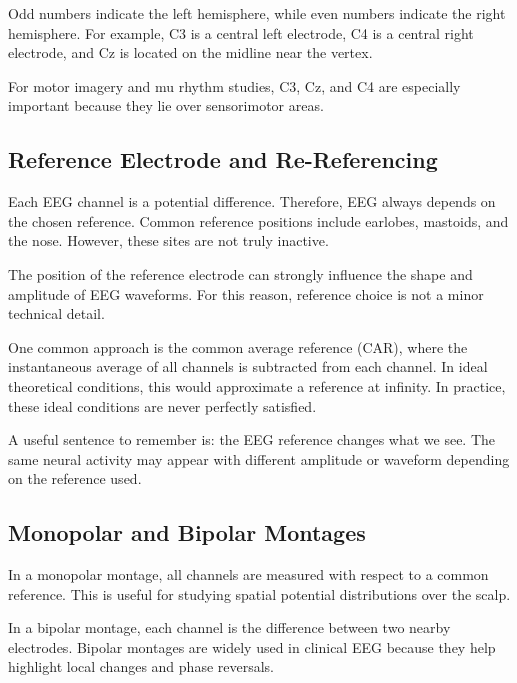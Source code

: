 Odd numbers indicate the left hemisphere, while even numbers indicate the right hemisphere. For example, C3 is a central left electrode, C4 is a central right electrode, and Cz is located on the midline near the vertex.

\begin{authornote}
For motor imagery and mu rhythm studies, C3, Cz, and C4 are especially important because they lie over sensorimotor areas.
\end{authornote}

\subsection{Reference Electrode and Re-Referencing}

Each EEG channel is a potential difference. Therefore, EEG always depends on the chosen reference. Common reference positions include earlobes, mastoids, and the nose. However, these sites are not truly inactive.

The position of the reference electrode can strongly influence the shape and amplitude of EEG waveforms. For this reason, reference choice is not a minor technical detail.

One common approach is the common average reference (CAR), where the instantaneous average of all channels is subtracted from each channel. In ideal theoretical conditions, this would approximate a reference at infinity. In practice, these ideal conditions are never perfectly satisfied.

\begin{authornote}
A useful sentence to remember is: the EEG reference changes what we see. The same neural activity may appear with different amplitude or waveform depending on the reference used.
\end{authornote}

\subsection{Monopolar and Bipolar Montages}

In a monopolar montage, all channels are measured with respect to a common reference. This is useful for studying spatial potential distributions over the scalp.

In a bipolar montage, each channel is the difference between two nearby electrodes. Bipolar montages are widely used in clinical EEG because they help highlight local changes and phase reversals.

